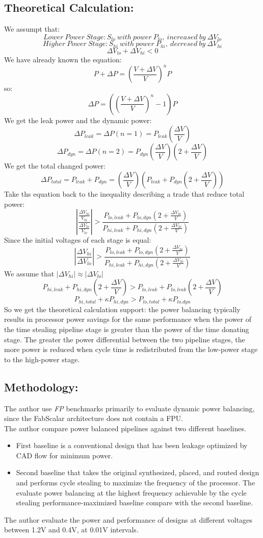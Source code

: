 \documentclass[10pt,a4paper]{article}
\begin{document}
\subsection{Theoretical Calculation:}
We assumpt that:
$$Lower\ Power\ Stage: S_{lo}\ with\ power\ P_{lo},\ increased\ by\ \Delta V_{lo}$$
$$Higher\ Power\ Stage: S_{hi}\ with\ power\ P_{hi},\ decresed\ by\ \Delta V_{hi}$$
$$\Delta V_{lo} + \Delta V_{hi} < 0 $$
We have already known the equation:
$$P + \Delta P = (\frac{V + \Delta V}{V})^n P$$
so:
$$\Delta P = ((\frac{V + \Delta V}{V})^n - 1) P$$
We get the leak power and the dynamic power:
$$\Delta P_{leak} = \Delta P(n = 1) = P_{leak}(\frac{\Delta V}{V})$$
$$\Delta P_{dyn} = \Delta P(n = 2) = P_{dyn}(\frac{\Delta V}{V})(2+\frac{\Delta V}{V})$$
We get the total changed power:
$$\Delta P_{total} = P_{leak} + P_{dyn} = (\frac{\Delta V}{V})(P_{leak} + P_{dyn}(2+\frac{\Delta V}{V}))$$
Take ths equation back to the inequality describing a trade that reduce total power:
$$\left\lvert \frac{\frac{\Delta V_{hi}}{V_{hi}}}{\frac{\Delta V_{lo}}{V_{lo}}}\right\rvert > \frac{P_{lo, leak}+P_{lo,dyn}(2+\frac{\Delta V_{lo}}{V})}{P_{hi, leak}+P_{hi,dyn}(2+\frac{\Delta V_{hi}}{V})}$$
Since the initial voltages of each stage is equal:
$$\left\lvert \frac{\Delta V_{hi}}{\Delta V_{lo}}\right\rvert > \frac{P_{lo, leak}+P_{lo,dyn}(2+\frac{\Delta V_{lo}}{V})}{P_{hi, leak}+P_{hi,dyn}(2+\frac{\Delta V_{hi}}{V})}$$
We assume that $\left\lvert \Delta V_{hi}\right\rvert \approx \left\lvert \Delta V_{lo}\right\rvert $
$$P_{hi,leak} + P_{hi,dyn}(2+\frac{\Delta V}{V}) > P_{lo, leak} + P_{lo, leak}(2+\frac{\Delta V}{V})$$
$$P_{hi,total} + \kappa P_{hi,dyn} > P_{lo,total} + \kappa P_{lo.dyn}$$
So we get the theoretical calculation support: the power balancing typically results in processor power savings for the same performance when the power of the time stealing pipeline stage is greater than the power of the time donating stage. The greater the
power differential between the two pipeline stages, the more power is reduced when cycle time is redistributed from the low-power stage to the high-power stage.
\subsection{Methodology:}
The author use \emph{FP} benchmarks primarily to evaluate dynamic power balancing, since the FabScalar architecture does not contain a FPU.\\
The author compare power balanced pipelines against two different baselines. 
\begin{itemize}
    \item First baseline is a conventional design that has been leakage optimized by CAD flow for minimum power. 
    \item Second baseline that takes the original synthesized, placed, and routed design and performs cycle stealing to maximize the frequency of the processor. The evaluate power balancing at the highest frequency achievable by the cycle stealing performance-maximized baseline compare with the second baseline.
\end{itemize}
The author evaluate the power and performance of designs at different voltages between 1.2V and 0.4V, at 0.01V intervals.
\end{document}
